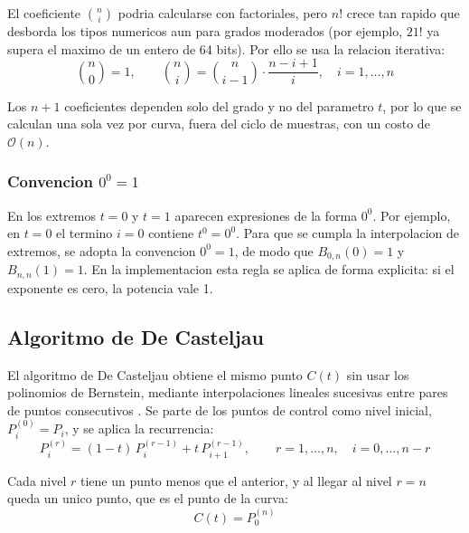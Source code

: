 El coeficiente $\binom{n}{i}$ podria calcularse con factoriales, pero $n!$ crece tan rapido que desborda los tipos numericos aun para grados moderados (por ejemplo, $21!$ ya supera el maximo de un entero de 64 bits). Por ello se usa la relacion iterativa:
\begin{equation}
\label{eq:fund_binomial}
\binom{n}{0} = 1, \qquad \binom{n}{i} = \binom{n}{i-1} \cdot \frac{n - i + 1}{i}, \quad i = 1, \dots, n
\end{equation}

Los $n+1$ coeficientes dependen solo del grado y no del parametro $t$, por lo que se calculan una sola vez por curva, fuera del ciclo de muestras, con un costo de $\mathcal{O}(n)$.

\subsubsection{Convencion $0^0 = 1$}

En los extremos $t = 0$ y $t = 1$ aparecen expresiones de la forma $0^0$. Por ejemplo, en $t = 0$ el termino $i = 0$ contiene $t^0 = 0^0$. Para que se cumpla la interpolacion de extremos, se adopta la convencion $0^0 = 1$, de modo que $B_{0,n}(0) = 1$ y $B_{n,n}(1) = 1$. En la implementacion esta regla se aplica de forma explicita: si el exponente es cero, la potencia vale 1.

\subsection{Algoritmo de De Casteljau}
\label{subsec:fund_casteljau}

El algoritmo de De Casteljau obtiene el mismo punto $C(t)$ sin usar los polinomios de Bernstein, mediante interpolaciones lineales sucesivas entre pares de puntos consecutivos \cite{farin2002,piegl1997}. Se parte de los puntos de control como nivel inicial, $P_i^{(0)} = P_i$, y se aplica la recurrencia:
\begin{equation}
\label{eq:casteljau}
P_i^{(r)} = (1 - t)\, P_i^{(r-1)} + t\, P_{i+1}^{(r-1)}, \qquad r = 1, \dots, n, \quad i = 0, \dots, n - r
\end{equation}

Cada nivel $r$ tiene un punto menos que el anterior, y al llegar al nivel $r = n$ queda un unico punto, que es el punto de la curva:
\begin{equation}
\label{eq:fund_casteljau_resultado}
C(t) = P_0^{(n)}
\end{equation}

